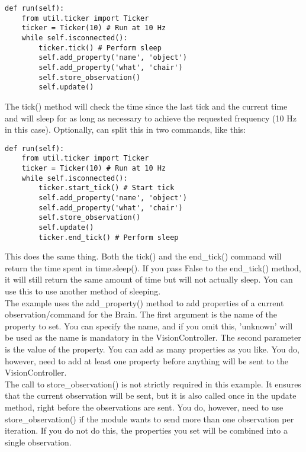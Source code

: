 \documentclass[a4paper, 10pt, oneside]{article}
\begin{document}
\begin{lstlisting}
def run(self):
    from util.ticker import Ticker
    ticker = Ticker(10) # Run at 10 Hz
    while self.isconnected():
        ticker.tick() # Perform sleep
        self.add_property('name', 'object')
        self.add_property('what', 'chair')
        self.store_observation()
        self.update()
\end{lstlisting}

The tick() method will check the time since the last tick and the current time
and will sleep for as long as necessary to achieve the requested frequency (10
Hz in this case). Optionally, can split this in two commands, like this: \\

\begin{lstlisting}
def run(self):
    from util.ticker import Ticker
    ticker = Ticker(10) # Run at 10 Hz
    while self.isconnected():
        ticker.start_tick() # Start tick
        self.add_property('name', 'object')
        self.add_property('what', 'chair')
        self.store_observation()
        self.update()
        ticker.end_tick() # Perform sleep
\end{lstlisting}

This does the same thing. Both the tick() and the end\_tick() command will
return the time spent in time.sleep(). If you pass False to the end\_tick()
method, it will still return the same amount of time but will not actually
sleep. You can use this to use another method of sleeping. \\

The example uses the add\_property() method to add properties of a current
observation/command for the Brain. The first argument is the name of the
property to set. You can specify the name, and if you omit this, 'unknown' will
be used as the name is mandatory in the VisionController. The second parameter
is the value of the property. You can add as many properties as you like. You
do, however, need to add at least one property before anything will be sent to
the VisionController. \\

The call to store\_observation() is not strictly required in this example. It
ensures that the current observation will be sent, but it is also called once in
the update method, right before the observations are sent. You do, however, need
to use store\_observation() if the module wants to send more than one
observation per iteration. If you do not do this, the properties you set will be
combined into a single observation. \\
\end{document}
